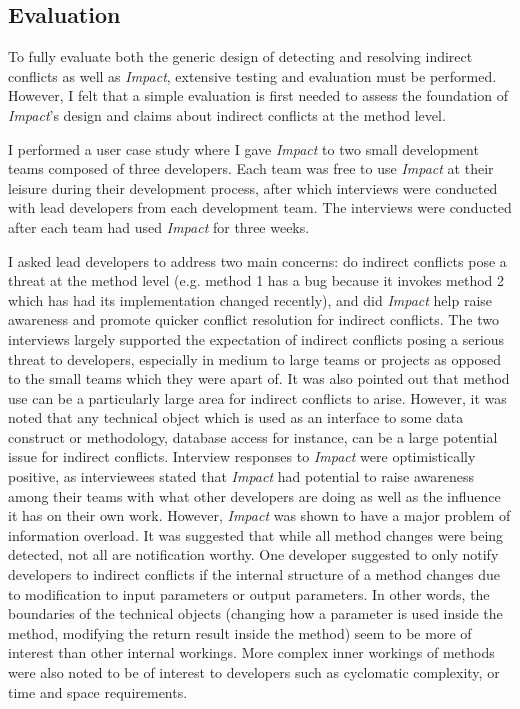 \subsection{Evaluation}
To fully evaluate both the generic design of detecting and resolving
indirect conflicts as well as \textit{Impact}, extensive testing and evaluation
must be performed. However, I felt that a simple evaluation is
first needed to assess the foundation of \textit{Impact}'s design and claims
about indirect conflicts at the method level.

I performed a user case study where I gave \textit{Impact} to 
two small development teams composed of three developers. Each team was
free to use \textit{Impact} at their leisure during their development process,
after which interviews were conducted with lead developers from 
each development team. The interviews were conducted after each
team had used \textit{Impact} for three weeks.

I asked lead developers to address two main concerns: do indirect
conflicts pose a threat
at the method level (e.g. method 1 has a bug because it invokes method
2 which has had its implementation changed recently), 
and did \textit{Impact} help raise
awareness and promote quicker conflict resolution for indirect
conflicts. The two interviews largely supported the expectation of
indirect conflicts posing a serious threat to developers, especially
in medium to large teams or projects as opposed to the small
teams which they were apart of. It was also pointed
out that method use can be a particularly large area for indirect
conflicts to arise. However, it was noted that
any technical object which is used as an interface to some data
construct or methodology, database access for instance, can be 
a large potential issue for indirect conflicts.  Interview responses to
\textit{Impact} were optimistically positive, as interviewees stated that \textit{Impact}
had potential to raise awareness among their teams with what other developers
are doing as well as the influence it has on their own work. However,
\textit{Impact} was shown to have a major problem of information overload. 
It was suggested
that while all method changes were being detected,
not all are notification worthy. One developer suggested to only notify
developers to indirect conflicts if the internal structure of a method
changes due to modification to input parameters or output parameters.
In other words, the boundaries of the technical objects (changing
how a parameter is used inside the method, modifying the return
result inside the method) seem to be more of interest than other 
internal workings. More complex inner workings of methods were also noted 
to be of interest to developers
such as cyclomatic complexity, or time and space requirements.

